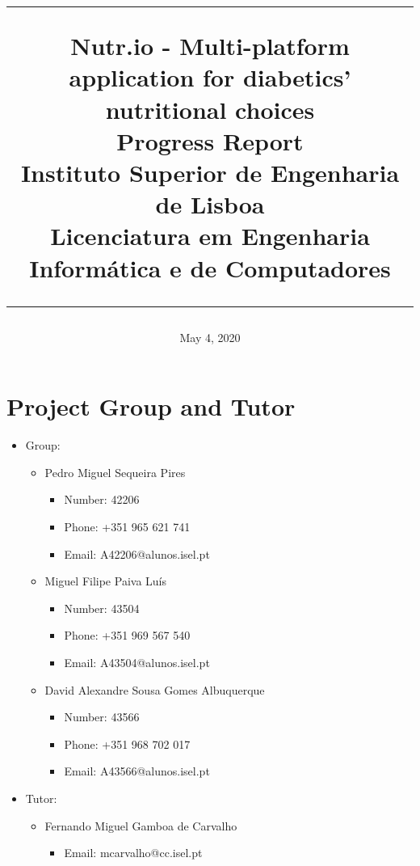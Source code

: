 \documentclass{article}
\title{
\vspace{-10mm}
\hrule
\vspace{5mm}
\Huge Nutr.io - Multi-platform application for diabetics' nutritional choices\\
\vspace{2mm}
\huge Progress Report\\
\vspace{2mm}
\Large Instituto Superior de Engenharia de Lisboa\\
\Large Licenciatura em Engenharia Informática e de Computadores
\vspace{5mm}
\hrule
\vspace{-10mm}
}
\date{May 4, 2020}
\begin{document}
\maketitle

\section{Project Group and Tutor}
    \begin{itemize}
        \item Group:
            \begin{itemize}
            \item Pedro Miguel Sequeira Pires
            \begin{itemize}
                \item Number: 42206
                \item Phone: +351 965 621 741
                \item Email: A42206@alunos.isel.pt
            \end{itemize}
        \end{itemize}
        \begin{itemize}
            \item Miguel Filipe Paiva Luís
            \begin{itemize}
                \item Number: 43504
                \item Phone: +351 969 567 540
                \item Email: A43504@alunos.isel.pt
            \end{itemize}
        \end{itemize}
        \begin{itemize}
            \item David Alexandre Sousa Gomes Albuquerque
            \begin{itemize}
                \item Number: 43566
                \item Phone: +351 968 702 017
                \item Email: A43566@alunos.isel.pt
            \end{itemize}
        \end{itemize}
    \end{itemize}
    \begin{itemize}
            \item Tutor:
            \begin{itemize}
                \item Fernando Miguel Gamboa de Carvalho
                \begin{itemize}
                    \item Email: mcarvalho@cc.isel.pt
                \end{itemize}
            \end{itemize}
        \end{itemize}
\end{document}
